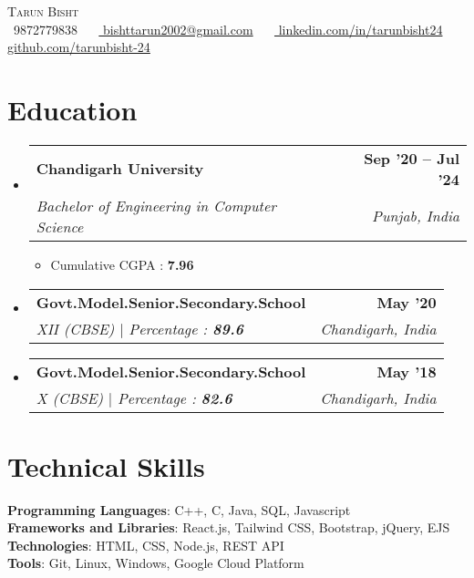 \documentclass[letterpaper,11pt]{article}
\makeatletter
\newcommand{\resumeItem}[1]{
  \item\small{
    {#1 \vspace{-2pt}}
  }
}
\newcommand{\resumeSubheading}[4]{
  \vspace{-2pt}\item
    \begin{tabular*}{1.0\textwidth}[t]{l@{\extracolsep{\fill}}r}
      \textbf{#1} & \textbf{\small #2} \\
      \textit{\small#3} & \textit{\small #4} \\
    \end{tabular*}\vspace{-7pt}
}
\newcommand{\resumeSubHeadingListStart}{\begin{itemize}[leftmargin=0.0in, label={}]}
\newcommand{\resumeSubHeadingListEnd}{\end{itemize}}
\newcommand{\resumeItemListStart}{\justify \begin{itemize} \vspace{-4pt}}
\newcommand{\resumeItemListEnd}{\end{itemize}\vspace{-1pt}}
\makeatother
\begin{document}

\begin{center}
    {\Huge \scshape Tarun Bisht} \\ \vspace{1pt}
    \vspace{5pt}
    \small \raisebox{-0.1\height}\faPhone\ 9872779838 ~ 
    \raisebox{-0.2\height}\faEnvelope\ \href{mailto:bishttarun2002@gmail.com}{ bishttarun2002@gmail.com} ~ 
    \raisebox{-0.2\height}\faLinkedin\ \href{https://www.linkedin.com/in/tarunbisht24/}{ linkedin.com/in/tarunbisht24} ~
    \raisebox{-0.2\height}\faGithub\ \href{https://github.com/tarunbisht-24}{ github.com/tarunbisht-24}
    \vspace{-8pt}
\end{center}


\section{Education}
  \resumeSubHeadingListStart
    \resumeSubheading
      {Chandigarh University}{Sep '20 -- Jul '24}
      {Bachelor of Engineering in Computer Science}{Punjab, India}
    \resumeItemListStart
      \resumeItem{Cumulative CGPA : \textbf{7.96}}
    \resumeItemListEnd
    \resumeSubheading
      {Govt.Model.Senior.Secondary.School}{May '20}
      {XII (CBSE) $|$ Percentage : \textbf{89.6}}{Chandigarh, India}
    \resumeSubheading
      {Govt.Model.Senior.Secondary.School}{May '18}
      {X (CBSE) $|$ Percentage : \textbf{82.6}}{Chandigarh, India}
  \resumeSubHeadingListEnd

\section{Technical Skills}
 \begin{itemize}[leftmargin=0.15in, label={}]
    {\item{
     \textbf{Programming Languages}{: C++, C, Java, SQL, Javascript} \\
     \vspace{1pt}
     \textbf{Frameworks and Libraries}{: React.js, Tailwind CSS, Bootstrap, jQuery, EJS} \\
     \vspace{1pt}
     \textbf{Technologies}{: HTML, CSS, Node.js, REST API} \\
     \vspace{1pt}
     \textbf{Tools}{: Git, Linux, Windows, Google Cloud Platform} \\
    }}
 \end{itemize}
 \vspace{-16pt}
\end{document}
